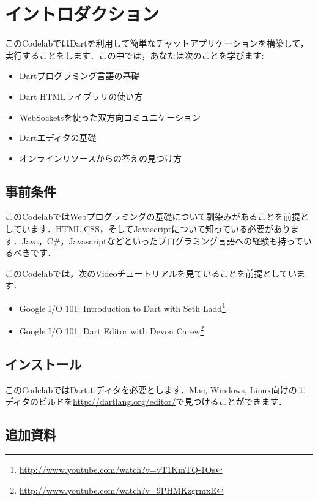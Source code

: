 \section*{イントロダクション}

このCodelabではDartを利用して簡単なチャットアプリケーションを構築して，実行することをします．この中では，あなたは次のことを学びます:

\begin{itemize}
\item Dartプログラミング言語の基礎
\item Dart HTMLライブラリの使い方
\item WebSocketsを使った双方向コミュニケーション
\item Dartエディタの基礎
\item オンラインリソースからの答えの見つけ方
\end{itemize}

\subsection{事前条件}

このCodelabではWebプログラミングの基礎について馴染みがあることを前提としています．HTML,CSS，そしてJavascriptについて知っている必要があります．Java，C\#，Javascriptなどといったプログラミング言語への経験も持っているべきです．

このCodelabでは，次のVideoチュートリアルを見ていることを前提としています．

\begin{itemize}
\item Google I/O 101: Introduction to Dart with Seth Ladd\footnote{\url{http://www.youtube.com/watch?v=vT1KmTQ-1Os}}
\item Google I/O 101: Dart Editor with Devon Carew\footnote{\url{http://www.youtube.com/watch?v=9PHMKzgrmxE}}
\end{itemize}

\subsection{インストール}

このCodelabではDartエディタを必要とします．Mac, Windows, Linux向けのエディタのビルドを\url{http://dartlang.org/editor/}で見つけることができます．

\subsection{追加資料}

